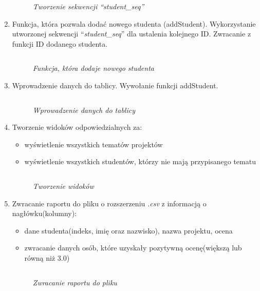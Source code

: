\documentclass[a4paper, 10pt]{article}
\begin{document}
\begin{enumerate}
\begin{figure}[H]
			\centering
			\caption{\textit{Tworzenie sekwencji ``student\_seq''}}
		\end{figure}
	\item Funkcja, która pozwala dodać nowego studenta (addStudent). Wykorzystanie utworzonej sekwencji ``\emph{student\_seq}'' dla ustalenia kolejnego ID. Zwracanie z funkcji ID dodanego studenta.
		\begin{lstlisting}[style=SQL, caption=\textit{Funkcja, która dodaje nowego studenta}]
		\end{lstlisting}
		\begin{figure}[H]
			\centering
			\caption{\textit{Funkcja, która dodaje nowego studenta}}
		\end{figure}
	\item Wprowadzenie danych do tablicy. Wywołanie funkcji addStudent.
		\begin{lstlisting}[style=SQL, caption=\textit{Wprowadzenie danych do tablicy}]
		\end{lstlisting}
		\begin{figure}[H]
			\centering
			\caption{\textit{Wprowadzenie danych do tablicy}}
		\end{figure}
	\item Tworzenie widoków odpowiedzialnych za:
		\begin{itemize}
			\item wyświetlenie wszystkich tematów projektów 
			\item wyświetlenie wszystkich studentów, którzy nie mają przypisanego tematu
		\end{itemize}
		\begin{lstlisting}[style=SQL, caption=\textit{Tworzenie widoków}]
		\end{lstlisting}
		\begin{figure}[H]
			\centering
			\caption{\textit{Tworzenie widoków}}
		\end{figure}
	\item Zwracanie raportu do pliku o rozszerzeniu \emph{.csv} z informacją o nagłówku(kolumny):
		\begin{itemize}
			\item dane studenta(indeks, imię oraz nazwisko), nazwa projektu, ocena
			\item zwracanie danych osób, które uzyskały pozytywną ocenę(większą lub równą niż 3.0)
		\end{itemize}
		\begin{lstlisting}[style=SQL, caption=\textit{Zwracanie raportu do pliku}]
		\end{lstlisting}
		\begin{figure}[H]
			\centering
			\caption{\textit{Zwracanie raportu do pliku}}
		\end{figure}
\end{enumerate}
\end{document}
